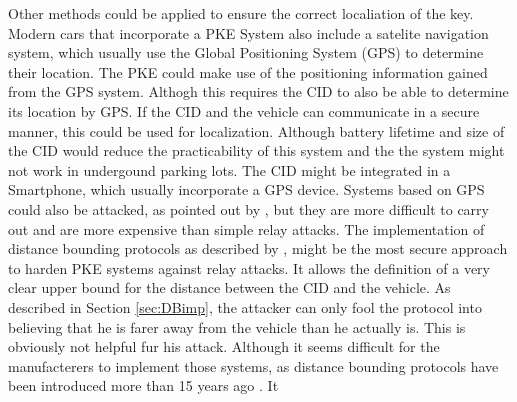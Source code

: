 	Other methods could be applied to ensure the correct localiation of the key.
	Modern cars that incorporate a PKE System also include a satelite navigation system,
	which usually use the Global Positioning System (GPS) to determine their location.
	The PKE could make use of the positioning information gained from the GPS system.
	Althogh this requires the CID to also be able to determine its location by GPS.
	If the CID and the vehicle can communicate in a secure manner,
	this could be used for localization.
	Although battery lifetime and size of the CID would reduce the practicability of this system
	and the the system might not work in undergound parking lots.
	The CID might be integrated in a Smartphone,
	which usually incorporate a GPS device.
	Systems based on GPS could also be attacked,
	as pointed out by \cite{someAttacksPKES},
	but they are more difficult to carry out and are more expensive than simple relay attacks.
	The implementation of distance bounding protocols as described by \cite{secPos},
	might be the most secure approach to harden PKE systems against relay attacks.
	It allows the definition of a very clear upper bound for the distance between
	the CID and the vehicle.
	As described in Section \ref{sec:DBimp},
	the attacker can only fool the protocol into believing that he is farer away from the
	vehicle than he actually is.
	This is obviously not helpful fur his attack.
	Although it seems difficult for the manufacterers to implement those systems,
	as distance bounding protocols have been introduced more than 15 years ago  \cite{distanceBoundingProtocols}.
	It 
	